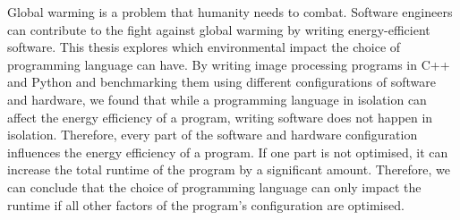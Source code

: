Global warming is a problem that humanity needs to combat.
Software engineers can contribute to the fight against global warming by writing energy-efficient software.
This thesis explores which environmental impact the choice of programming language can have.
By writing image processing programs in C++ and Python and benchmarking them using different configurations of software and
hardware, we found that while a programming language in isolation can affect the energy efficiency of a program,
writing software does not happen in isolation.
Therefore, every part of the software and hardware configuration influences the energy efficiency of a program.
If one part is not optimised, it can increase the total runtime of the program by a significant amount.
Therefore, we can conclude that the choice of programming language can only impact the runtime if all other factors of the program's configuration are optimised.

